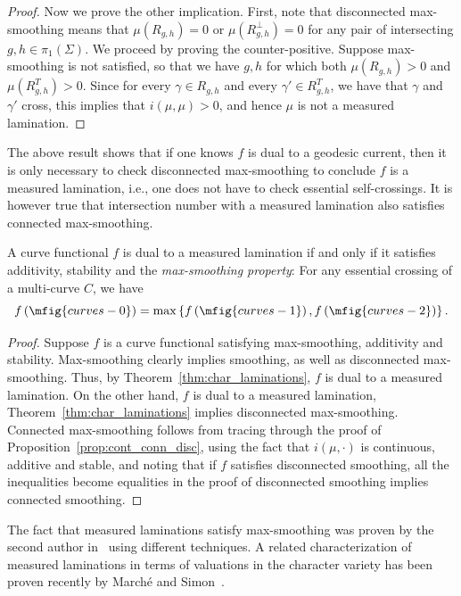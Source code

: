 \begin{proof}
Now we prove the other implication.
First, note that disconnected max-smoothing means that $\mu(R_{g,h})=0$ or $\mu(R_{g,h}^{\perp})=0$ for any pair of intersecting $g,h \in \pi_1(\Sigma)$.
We proceed by proving the counter-positive.
Suppose max-smoothing is not satisfied, so that we have $g,h$ for which both $\mu(R_{g,h})>0$ and $\mu(R_{g,h}^T)>0$. Since for every $\gamma \in R_{g,h}$ and every $\gamma' \in R_{g,h}^T$, we have that $\gamma$ and $\gamma'$ cross, this implies that $i(\mu, \mu) >0$, and hence $\mu$ is not a measured lamination.
\end{proof}

The above result shows that if one knows $f$ is dual to a geodesic current, then it is only necessary to check disconnected max-smoothing to conclude $f$ is a measured lamination, i.e., one does not have to check essential self-crossings. It is however true that intersection number with a measured lamination also satisfies connected max-smoothing.

\begin{theorem}
A curve functional $f$ is dual to a measured lamination if and only if it satisfies additivity, stability and the \emph{max-smoothing property}:
    For any essential crossing of a multi-curve $C$, we have
    \begin{equation}\label{eq:MLsmoothing}
      f\left(\mfig{curves-0}\right) = \max \left\{ f\left(\mfig{curves-1}\right),f\left(\mfig{curves-2}\right) \right\}.
    \end{equation}
    \label{prop:char_laminations_plus}
\end{theorem}
\begin{proof}
Suppose $f$ is a curve functional satisfying max-smoothing, additivity and stability. Max-smoothing clearly implies smoothing, as well as disconnected max-smoothing. Thus, by Theorem~\ref{thm:char_laminations}, $f$ is dual to a measured lamination. On the other hand, $f$ is dual to a measured lamination,  Theorem~\ref{thm:char_laminations} implies disconnected max-smoothing. Connected max-smoothing follows from tracing through the proof of Proposition~\ref{prop:cont_conn_disc}, using the fact that $i(\mu, \cdot)$ is continuous, additive and stable, and noting that if $f$ satisfies disconnected smoothing, all the inequalities become equalities in the proof of disconnected smoothing implies connected smoothing.
\end{proof}

The fact that measured laminations satisfy max-smoothing was proven by
the second author in~\cite{Thu00:GeometricIntersection} using
different techniques. A related characterization of measured
laminations in terms of valuations in the character variety has been
proven recently by Marché and Simon~\cite[Theorem~3.1]{MS21:Valuations}.

